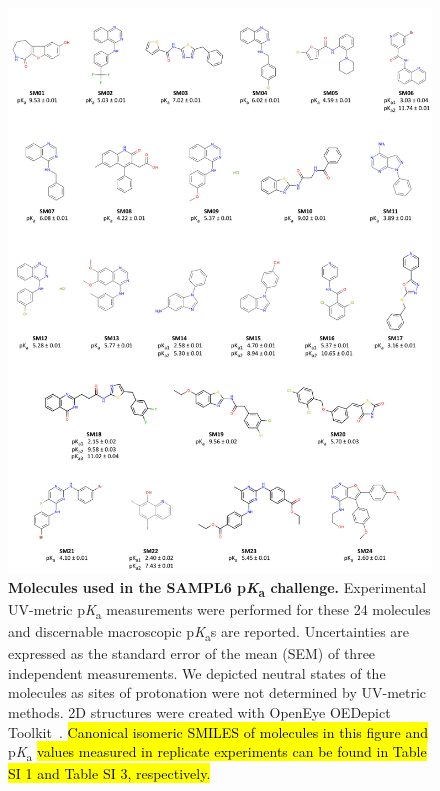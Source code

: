 \documentclass[9pt,lineno]{elife}
\newcommand{\pKa}{p\textit{K}\textsubscript{a}}
\begin{document}
\begin{figure}
\includegraphics[width=1.00\linewidth]{figures/SAMPL6_pKa_molecules_fig}
\caption{{\bf Molecules used in the SAMPL6 \pKa{} challenge.} 
Experimental UV-metric \pKa{} measurements were performed for these 24 molecules and discernable macroscopic \pKa{}s are reported. 
Uncertainties are expressed as the standard error of the mean (SEM) of three independent measurements. We depicted neutral states of the molecules as sites of protonation were not determined by UV-metric methods.
2D structures were created with OpenEye OEDepict Toolkit~\citep{oedepict_openeye_2017}. \hl{Canonical isomeric SMILES of molecules in this figure and} \pKa{} \hl{values measured in replicate experiments can be found in Table SI 1 and Table SI 3, respectively.}
}
\label{fig:pKa_molecules}
\end{figure}
\end{document}
